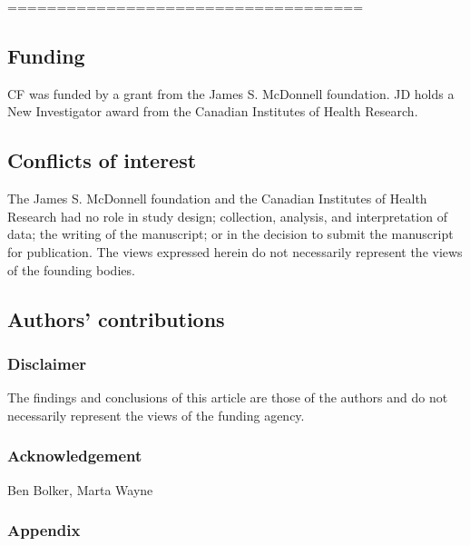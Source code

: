 \documentclass[12pt,]{article}
\begin{document}
====================================
\subsection{Funding}\label{Funding}

CF was funded by a grant from the James S. McDonnell foundation. JD holds a New Investigator award from the Canadian Institutes of Health Research.

\subsection{Conflicts of interest}\label{Conflicts-of-Interest}

The James S. McDonnell foundation and the Canadian Institutes of Health Research had no role in study design; collection, analysis, and interpretation of data; the writing of the manuscript; or in the decision to submit the manuscript for publication.  The views expressed herein do not necessarily represent the views of the founding bodies.

\subsection{Authors' contributions}\label{Authors'-contributions}

\subsubsection{Disclaimer}\label{disclaimer}

The findings and conclusions of this article are those of the authors
and do not necessarily represent the views of the funding agency.

\subsubsection{Acknowledgement}\label{Acknowledgement}
Ben Bolker,  Marta Wayne

\subsubsection{Appendix}\label{appendix-1}


\end{document}
